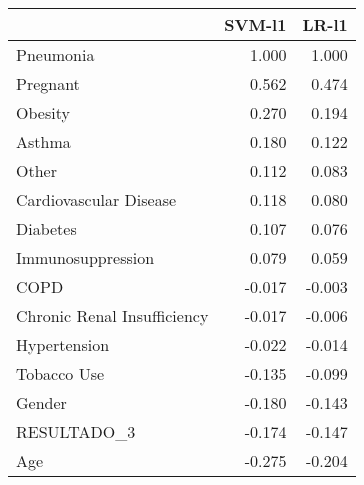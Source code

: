 \begin{tabular}{lrr}
\toprule
{} &  SVM-l1 &  LR-l1 \\
\midrule
Pneumonia                   &   1.000 &  1.000 \\
Pregnant                    &   0.562 &  0.474 \\
Obesity                     &   0.270 &  0.194 \\
Asthma                      &   0.180 &  0.122 \\
Other                       &   0.112 &  0.083 \\
Cardiovascular Disease      &   0.118 &  0.080 \\
Diabetes                    &   0.107 &  0.076 \\
Immunosuppression           &   0.079 &  0.059 \\
COPD                        &  -0.017 & -0.003 \\
Chronic Renal Insufficiency &  -0.017 & -0.006 \\
Hypertension                &  -0.022 & -0.014 \\
Tobacco Use                 &  -0.135 & -0.099 \\
Gender                      &  -0.180 & -0.143 \\
RESULTADO\_3                 &  -0.174 & -0.147 \\
Age                         &  -0.275 & -0.204 \\
\bottomrule
\end{tabular}
